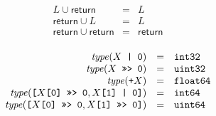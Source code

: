 \documentclass{article}
\newcommand{\type}{\mathit{type}}
\newcommand{\mathjs}[1]{\mbox{\texttt{{#1}}}}
\newcommand{\boolean}{\mathtt{bits1}}
\newcommand{\uintfour}{\mathtt{uint32}}
\newcommand{\uinteight}{\mathtt{uint64}}
\newcommand{\intone}{\mathtt{int8}}
\newcommand{\inttwo}{\mathtt{int16}}
\newcommand{\intfour}{\mathtt{int32}}
\newcommand{\inteight}{\mathtt{int64}}
\newcommand{\double}{\mathtt{float64}}
\newcommand{\str}{\mathtt{string}}
\newcommand{\nul}{\mathtt{null}}
\newcommand{\mustret}{\mathsf{return}}
\newcommand{\getprop}[2]{{#1}\mathjs{[}{#2}\mathjs{]}}
\newcommand{\longlong}[2]{\mathjs{[}{#1},{#2}\mathjs{]}}
\newcommand{\toint}[1]{{#1}\mathjs{ | 0}}
\newcommand{\touint}[1]{{#1}\mathjs{ >>> 0}}
\begin{document}
\[
\begin{array}{rcl}
L        \cup \mustret & = & L \\
\mustret \cup L        & = & L \\
\mustret \cup \mustret & = & \mustret \\
\end{array}
\]

\[
\begin{array}{rcl}
\type(\toint{X}) & = & \intfour \\
\type(\touint{X}) & = & \uintfour \\
\type(\mathjs{+}X) & = & \double \\
\type(\longlong{\touint{\getprop{X}{\mathjs{0}}}}{\toint{\getprop{X}{\mathjs{1}}}}) & = & \inteight \\
\type(\longlong{\touint{\getprop{X}{\mathjs{0}}}}{\touint{\getprop{X}{\mathjs{1}}}}) & = & \uinteight \\
\end{array}
\]

\end{document}
